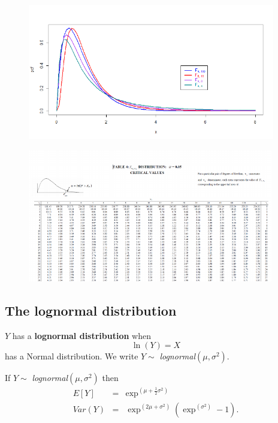 \documentclass[notes=show,smaller,handout]{beamer}\usepackage[]{graphicx}\usepackage[]{color}
\begin{document}
\begin{frame}{\subsecname}

  \begin{figure}[ptb]\centering
  \includegraphics[height=2.3324in, width=4.2462in]{img/F-dist_pds__6.pdf}%
  \end{figure}%
\end{frame}%

\begin{frame}
  \begin{figure}[ptb]\centering
  \includegraphics[height=2.2753in, width=4.2263in]{img/Fdist_table__7.pdf}%
  \end{figure}
\end{frame}%

\subsection{The lognormal distribution}

\begin{frame}{\subsecname}
  \begin{definition}
   $Y$ has a \textbf{lognormal distribution} when
   $$\ln \left( Y\right) =X$$
  has a Normal distribution. We write $Y\sim $ \emph{lognormal}$\left( \mu ,\sigma ^{2}\right) $.
  \end{definition}

  \medskip

  If $Y\sim $ \emph{lognormal}$\left( \mu ,\sigma ^{2}\right) $ then%
  \begin{eqnarray*}
  E\left[ Y\right] &=&\exp^{ \left( \mu +\frac{1}{2}\sigma ^{2}\right)} \\
  Var(Y) &=&\exp^{ \left( 2\mu +\sigma ^{2}\right)} \left( \exp^{ \left( \sigma
  ^{2}\right)} -1\right).
  \end{eqnarray*}
\end{frame}
\end{document}
